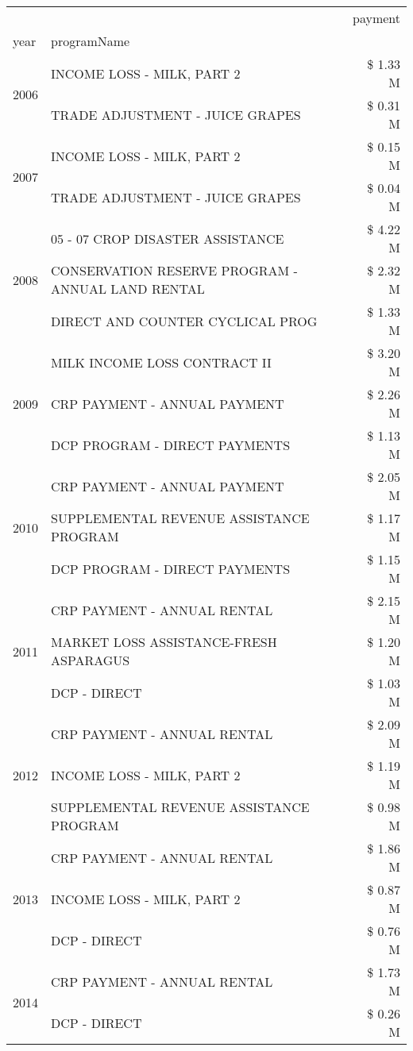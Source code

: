 \begin{tabular}{llr}
\toprule
 &  & payment \\
year & programName &  \\
\midrule
\multirow[t]{2}{*}{2006} & INCOME LOSS - MILK, PART 2 & \$ 1.33 M \\
 & TRADE ADJUSTMENT - JUICE GRAPES & \$ 0.31 M \\
\cline{1-3}
\multirow[t]{2}{*}{2007} & INCOME LOSS - MILK, PART 2 & \$ 0.15 M \\
 & TRADE ADJUSTMENT - JUICE GRAPES & \$ 0.04 M \\
\cline{1-3}
\multirow[t]{3}{*}{2008} & 05 - 07 CROP DISASTER ASSISTANCE & \$ 4.22 M \\
 & CONSERVATION RESERVE PROGRAM - ANNUAL LAND RENTAL & \$ 2.32 M \\
 & DIRECT AND COUNTER CYCLICAL PROG & \$ 1.33 M \\
\cline{1-3}
\multirow[t]{3}{*}{2009} & MILK INCOME LOSS CONTRACT II & \$ 3.20 M \\
 & CRP PAYMENT - ANNUAL PAYMENT & \$ 2.26 M \\
 & DCP PROGRAM - DIRECT PAYMENTS & \$ 1.13 M \\
\cline{1-3}
\multirow[t]{3}{*}{2010} & CRP PAYMENT - ANNUAL PAYMENT & \$ 2.05 M \\
 & SUPPLEMENTAL REVENUE ASSISTANCE PROGRAM & \$ 1.17 M \\
 & DCP PROGRAM - DIRECT PAYMENTS & \$ 1.15 M \\
\cline{1-3}
\multirow[t]{3}{*}{2011} & CRP PAYMENT - ANNUAL RENTAL & \$ 2.15 M \\
 & MARKET LOSS ASSISTANCE-FRESH ASPARAGUS & \$ 1.20 M \\
 & DCP - DIRECT & \$ 1.03 M \\
\cline{1-3}
\multirow[t]{3}{*}{2012} & CRP PAYMENT - ANNUAL RENTAL & \$ 2.09 M \\
 & INCOME LOSS - MILK, PART 2 & \$ 1.19 M \\
 & SUPPLEMENTAL REVENUE ASSISTANCE PROGRAM & \$ 0.98 M \\
\cline{1-3}
\multirow[t]{3}{*}{2013} & CRP PAYMENT - ANNUAL RENTAL & \$ 1.86 M \\
 & INCOME LOSS - MILK, PART 2 & \$ 0.87 M \\
 & DCP - DIRECT & \$ 0.76 M \\
\cline{1-3}
\multirow[t]{3}{*}{2014} & CRP PAYMENT - ANNUAL RENTAL & \$ 1.73 M \\
 & DCP - DIRECT & \$ 0.26 M \\

\end{tabular}
